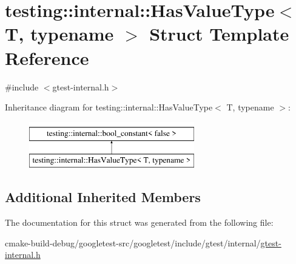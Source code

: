 \hypertarget{structtesting_1_1internal_1_1HasValueType}{}\section{testing\+::internal\+::Has\+Value\+Type$<$ T, typename $>$ Struct Template Reference}
\label{structtesting_1_1internal_1_1HasValueType}


{\ttfamily \#include $<$gtest-\/internal.\+h$>$}

Inheritance diagram for testing\+::internal\+::Has\+Value\+Type$<$ T, typename $>$\+:\begin{figure}[H]
\begin{center}
\leavevmode
\includegraphics[height=2.000000cm]{structtesting_1_1internal_1_1HasValueType}
\end{center}
\end{figure}
\subsection*{Additional Inherited Members}


The documentation for this struct was generated from the following file\+:\begin{DoxyCompactItemize}
\item 
cmake-\/build-\/debug/googletest-\/src/googletest/include/gtest/internal/\mbox{\hyperlink{gtest-internal_8h}{gtest-\/internal.\+h}}\end{DoxyCompactItemize}
